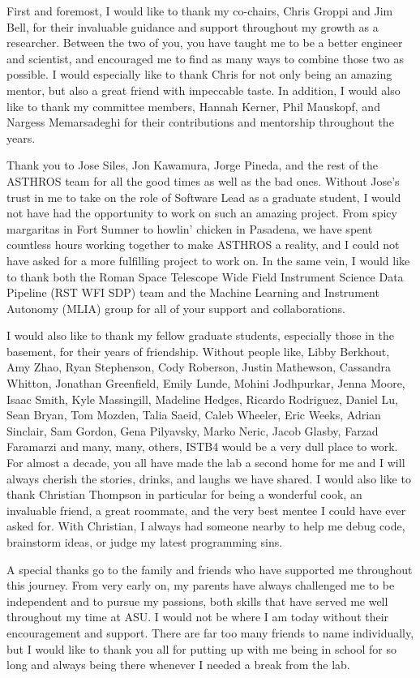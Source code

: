 First and foremost, I would like to thank my co-chairs, Chris Groppi and Jim Bell, for their invaluable guidance and support throughout my growth as a researcher.
Between the two of you, you have taught me to be a better engineer and scientist, and encouraged me to find as many ways to combine those two as possible.
I would especially like to thank Chris for not only being an amazing mentor, but also a great friend with impeccable taste. 
In addition, I would also like to thank my committee members, Hannah Kerner, Phil Mauskopf, and Nargess Memarsadeghi for their contributions and mentorship throughout the years. 

Thank you to Jose Siles, Jon Kawamura, Jorge Pineda, and the rest of the ASTHROS team for all the good times as well as the bad ones.
Without Jose's trust in me to take on the role of Software Lead as a graduate student, I would not have had the opportunity to work on such an amazing project.
From spicy margaritas in Fort Sumner to howlin' chicken in Pasadena, we have spent countless hours working together to make ASTHROS a reality, and I could not have asked for a more fulfilling project to work on.
In the same vein, I would like to thank both the Roman Space Telescope Wide Field Instrument Science Data Pipeline (RST WFI SDP) team and the Machine Learning and Instrument Autonomy (MLIA) group for all of your support and collaborations.

I would also like to thank my fellow graduate students, especially those in the basement, for their years of friendship.
Without people like, Libby Berkhout, Amy Zhao, Ryan Stephenson, Cody Roberson, Justin Mathewson, Cassandra Whitton, Jonathan Greenfield, Emily Lunde, Mohini Jodhpurkar, Jenna Moore, Isaac Smith, Kyle Massingill, Madeline Hedges, Ricardo Rodriguez, Daniel Lu, Sean Bryan, Tom Mozden, Talia Saeid, Caleb Wheeler, Eric Weeks, Adrian Sinclair, Sam Gordon, Gena Pilyavsky, Marko Neric, Jacob Glasby, Farzad Faramarzi and many, many, others, ISTB4 would be a very dull place to work. 
For almost a decade, you all have made the lab a second home for me and I will always cherish the stories, drinks, and laughs we have shared.
I would also like to thank Christian Thompson in particular for being a wonderful cook, an invaluable friend, a great roommate, and the very best mentee I could have ever asked for.
With Christian, I always had someone nearby to help me debug code, brainstorm ideas, or judge my latest programming sins.

A special thanks go to the family and friends who have supported me throughout this journey. 
From very early on, my parents have always challenged me to be independent and to pursue my passions, both skills that have served me well throughout my time at ASU.
I would not be where I am today without their encouragement and support.
There are far too many friends to name individually, but I would like to thank you all for putting up with me being in school for so long and always being there whenever I needed a break from the lab.

